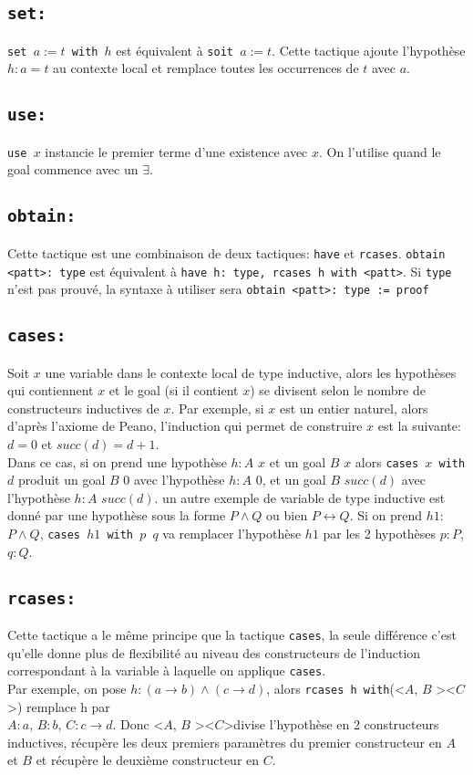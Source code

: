     \subsection{\texttt{set:}}
    \texttt{set $a := t$ with $h$} est équivalent à \texttt{soit $a := t$}. Cette tactique ajoute l'hypothèse $h : a = t$ au contexte local et remplace toutes les occurrences de $t$ avec $a$.
    \subsection{\texttt{use:}}
    \texttt{use $x$} instancie le premier terme d'une existence avec $x$. On l'utilise quand le goal commence avec un $\exists$. 
    \subsection{ \texttt{obtain:}}
    Cette tactique est une combinaison de deux tactiques: \texttt{have} et \texttt{rcases}.
    \texttt{obtain \textless patt\textgreater : type}  est équivalent à \texttt{have h: type, rcases h with \textless patt\textgreater}. Si \texttt{type} n'est pas prouvé, la syntaxe à utiliser sera \texttt{obtain \textless patt\textgreater : type := proof}
    \subsection{\texttt{cases:}}
    Soit $x$ une variable dans le contexte local de type inductive, alors les hypothèses qui contiennent $x$ et le goal (si il contient $x$) se divisent selon le nombre de constructeurs inductives de $x$. Par exemple, si $x$ est un entier naturel, alors d'après l'axiome de Peano, l'induction qui permet de construire $x$ est la suivante: $d=0$ et $succ(d)=d+1$. \\ Dans ce cas, si on prend une hypothèse $h:A$ $x$ et un goal $B$ $x$ alors \texttt{cases $x$ with $d$} produit un goal $B$ $0$ avec l'hypothèse $h:A$ $0$, et un goal $B$ $succ(d)$ avec l'hypothèse $h:A$ $succ(d)$. 
    un autre exemple de variable de type inductive est donné par une hypothèse sous la forme $P\wedge Q$ ou bien $P\leftrightarrow Q$. Si on prend $h1:$ $P\wedge Q$, \texttt{cases $h1$ with $p$ $q$} va remplacer l'hypothèse $h1$ par les 2 hypothèses $p:P$, $q:Q$.
    \subsection{ \texttt{rcases:}}
     Cette tactique a le même principe que la tactique \texttt{cases}, la seule différence c'est qu'elle donne plus de flexibilité au niveau des constructeurs de l'induction correspondant à la variable à laquelle on applique \texttt{cases}. \\ Par exemple, on pose $h:(a\rightarrow b)\wedge(c\rightarrow d)$, alors \texttt{rcases h with}(\textless $A$, $B$ \textgreater \textbar \textless $C$ \textgreater) remplace h par \\ $A:a$, $B:b$, $C:c\rightarrow d$. Donc \textless $A$, $B$ \textgreater \textbar \textless $C$\textgreater divise l'hypothèse en 2 constructeurs inductives, récupère les deux premiers paramètres du premier constructeur en $A$ et $B$ et récupère le deuxième constructeur en $C$. 
